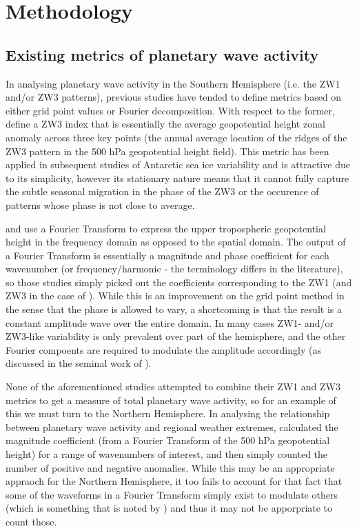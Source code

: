 \section{Methodology}\label{s:methodology}

\subsection{Existing metrics of planetary wave activity}\label{s:existing_metrics}

In analysing planetary wave activity in the Southern Hemisphere (i.e. the ZW1 and/or ZW3 patterns), previous studies have tended to define metrics based on either grid point values or Fourier decomposition. With respect to the former, \citet{Raphael2004} define a ZW3 index that is essentially the average geopotential height zonal anomaly across three key points (the annual average location of the ridges of the ZW3 pattern in the 500 hPa geopotential height field). This metric has been applied in subsequent studies of Antarctic sea ice variability \citep{Raphael2007,Raphael2014} and is attractive due to its simplicity, however its stationary nature means that it cannot fully capture the subtle \citep[but not insignificant at around 15 degrees of longitude on average;][]{vanLoon1984,Mo1985} seasonal migration in the phase of the ZW3 or the occurence of patterns whose phase is not close to average.

\citet{Hobbs2007} and \citet{Hobbs2010} use a Fourier Transform to express the upper tropospheric geopotential height in the frequency domain as opposed to the spatial domain. The output of a Fourier Transform is essentially a magnitude and phase coefficient for each wavenumber (or frequency/harmonic - the terminology differs in the literature), so those studies simply picked out the coefficients corresponding to the ZW1 (and ZW3 in the case of \citet{Hobbs2010}). While this is an improvement on the grid point method in the sense that the phase is allowed to vary, a shortcoming is that the result is a constant amplitude wave over the entire domain. In many cases ZW1- and/or ZW3-like variability is only prevalent over part of the hemisphere, and the other Fourier compoents are required to modulate the amplitude accordingly (as discussed in the seminal work of \citet{vanLoon1972}).

None of the aforementioned studies attempted to combine their ZW1 and ZW3 metrics to get a measure of total planetary wave activity, so for an example of this we must turn to the Northern Hemisphere. In analysing the relationship between planetary wave activity and regional weather extremes, \citet{Screen2014} calculated the magnitude coefficient (from a Fourier Transform of the 500 hPa geopotential height) for a range of wavenumbers of interest, and then simply counted the number of positive and negative anomalies. While this may be an appropriate appraoch for the Northern Hemisphere, it too fails to account for that fact that some of the waveforms in a Fourier Transform simply exist to modulate others (which is something that is noted by \citet{Screen2014}) and thus it may not be apporpriate to count those.  